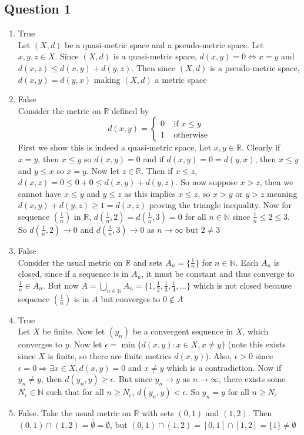 \documentclass[letterpaper, 11pt]{article}
\newcommand{\R}{\mathbb{R}}   %
\newcommand{\N}{\mathbb{N}}   %
\newcommand{\1}{\mathds{1}}	%
\theoremstyle{definition}
\begin{document}
\subsection*{Question 1}

\begin{enumerate}[label=(\alph*)]
\item True \\ Let $(X,d)$ be a quasi-metric space and a pseudo-metric space. Let $x,y,z \in X$. Since $(X,d)$ is a quasi-metric space, $d(x,y)=0 \iff x=y$ and $d(x,z) \le d(x,y) + d(y,z)$. Then since $(X,d)$ is a pseudo-metric space, $d(x,y)=d(y,x)$ making $(X,d)$ a metric space
\item False \\ Consider the metric on $\R$ defined by 
\[
d(x,y) = \begin{cases} 0 \ \ \ \ \ \text{if } x\le y \\ 1 \ \ \ \ \ \text{otherwise} \end{cases}
\]
First we show this is indeed a quasi-metric space. Let $x,y \in \R$. Clearly if $x=y$, then $x \le y$ so $d(x,y)=0$ and if $d(x,y)=0=d(y,x)$, then $x \le y$ and $y \le x$ so $x=y$. 
Now let $z \in \R$. Then if $x\le z$, $d(x,z) = 0 \le 0 + 0 \le d(x,y) + d(y,z)$. So now suppose $x > z$, then we cannot have $x \le y$ and $y \le z$ as this implies $x \le z$, so $x > y$ or $y > z$ meaning $d(x,y) + d(y,z) \ge 1 = d(x,z)$ proving the triangle inequality.
Now for sequence $(\frac{1}{n})$ in $\R$, $d(\frac{1}{n}, 2) = d(\frac{1}{n}, 3) = 0$ for all $n \in \N$ since $\frac{1}{n} \le 2 \le 3$. So $d(\frac{1}{n}, 2) \to 0$ and $d(\frac{1}{n}, 3) \to 0$ as $n \to \infty$ but $2 \ne 3$

\item False \\ Consider the usual metric on $\R$ and sets $A_n = \{\frac{1}{n}\}$ for $n \in \N$. Each $A_n$ is closed, since if a sequence is in $A_n$, it must be constant and thus converge to $\frac{1}{n} \in A_n$. But now $A = \bigcup _{n \in \N} A_n = \{1, \frac{1}{2}, \frac{1}{3}, \frac{1}{4}, ...\}$ which is not closed because sequence $(\frac{1}{n})$ is in $A$ but converges to $0 \notin A$
\item True \\ 
Let $X$ be finite. Now let $(y_n)$ be a convergent sequence in $X$, which converges to $y$.  Now let $\epsilon = \min \{d(x, y) : x \in X, x \ne y \}$ (note this exists since $X$ is finite, so there are finite metrics $d(x,y)$). Also, $\epsilon > 0$ since $\epsilon = 0 \Rightarrow \exists x \in X, d(x,y) = 0$ and $x \ne y$ which is a contradiction. Now if $y_n \ne y$, then $d(y_n, y) \ge \epsilon$. But since $y_n \to y$ as $n \to \infty$, there exists some $N_\epsilon \in \N$ such that for all $n \ge N_{\epsilon}$, $d(y_{n}, y) < \epsilon$. So $y_n = y$ for all $n \ge N_\epsilon$
\item False. Take the usual metric on $\R$ with sets $(0,1)$ and $(1,2)$. Then $\overline{(0,1) \cap (1,2)} = \overline{\emptyset} = \emptyset$, but $\overline{(0,1)} \cap \overline{(1,2)} = [0,1] \cap [1,2] = \{1\} \ne \emptyset$
\end{enumerate}
\newpage
\end{document}
